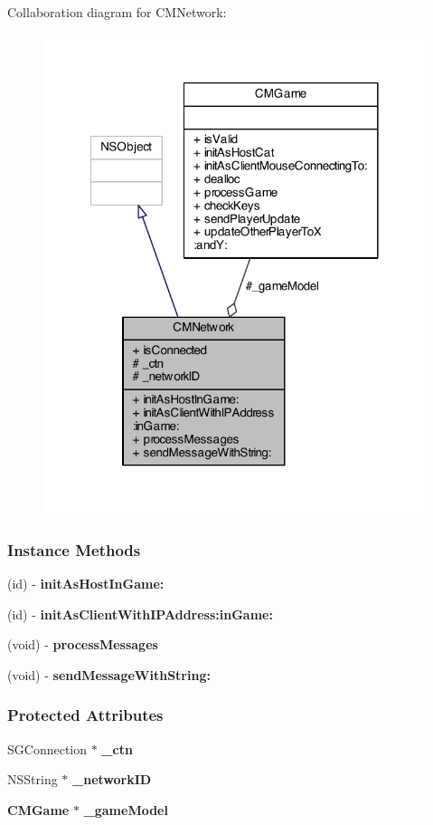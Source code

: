 Collaboration diagram for C\-M\-Network\-:
\nopagebreak
\begin{figure}[H]
\begin{center}
\leavevmode
\includegraphics[width=317pt]{interface_c_m_network__coll__graph}
\end{center}
\end{figure}
\subsubsection*{Instance Methods}
\begin{DoxyCompactItemize}
\item 
(id) -\/ {\bf init\-As\-Host\-In\-Game\-:}
\item 
(id) -\/ {\bf init\-As\-Client\-With\-I\-P\-Address\-:in\-Game\-:}
\item 
(void) -\/ {\bf process\-Messages}
\item 
(void) -\/ {\bf send\-Message\-With\-String\-:}
\end{DoxyCompactItemize}
\subsubsection*{Protected Attributes}
\begin{DoxyCompactItemize}
\item 
S\-G\-Connection $\ast$ {\bf \-\_\-ctn}
\item 
N\-S\-String $\ast$ {\bf \-\_\-network\-I\-D}
\item 
{\bf C\-M\-Game} $\ast$ {\bf \-\_\-game\-Model}
\end{DoxyCompactItemize}
